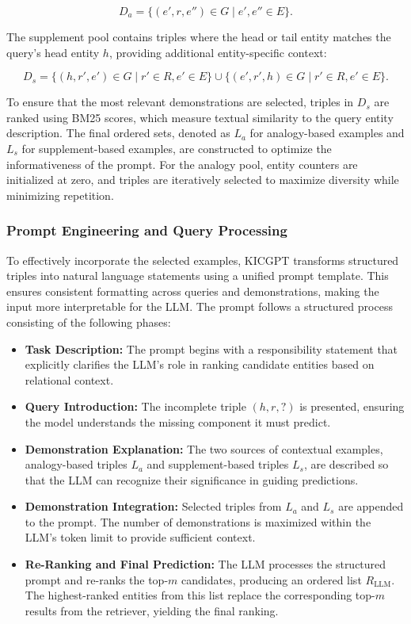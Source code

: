 \documentclass[12pt,a4paper]{article}
\begin{document}
\[
    D_a = \{(e', r, e'') \in G \mid e', e'' \in E\}.
\]

The supplement pool contains triples where the head or tail entity matches the query's head entity \( h \), providing additional entity-specific context:

\[
    D_s = \{(h, r', e') \in G \mid r' \in R, e' \in E\} \cup \{(e', r', h) \in G \mid r' \in R, e' \in E\}.
\]

To ensure that the most relevant demonstrations are selected, triples in \( D_s \) are ranked using BM25 scores, which measure textual similarity to the query entity description.
The final ordered sets, denoted as \( L_a \) for analogy-based examples and \( L_s \) for supplement-based examples, are constructed to optimize the informativeness of the prompt.
For the analogy pool, entity counters are initialized at zero, and triples are iteratively selected to maximize diversity while minimizing repetition.

\subsubsection{Prompt Engineering and Query Processing}

To effectively incorporate the selected examples, KICGPT transforms structured triples into natural language statements using a unified prompt template.
This ensures consistent formatting across queries and demonstrations, making the input more interpretable for the LLM. The prompt follows a structured process consisting of the following phases:

\begin{itemize}
    \item \textbf{Task Description:} The prompt begins with a responsibility statement that explicitly clarifies the LLM’s role in ranking candidate entities based on relational context.
    \item \textbf{Query Introduction:} The incomplete triple \( (h, r, ?) \) is presented, ensuring the model understands the missing component it must predict.
    \item \textbf{Demonstration Explanation:} The two sources of contextual examples, analogy-based triples \( L_a \) and supplement-based triples \( L_s \), are described so that the LLM can recognize their significance in guiding predictions.
    \item \textbf{Demonstration Integration:} Selected triples from \( L_a \) and \( L_s \) are appended to the prompt.
    The number of demonstrations is maximized within the LLM’s token limit to provide sufficient context.
    \item \textbf{Re-Ranking and Final Prediction:} The LLM processes the structured prompt and re-ranks the top-\( m \) candidates, producing an ordered list \( R_{\text{LLM}} \).
    The highest-ranked entities from this list replace the corresponding top-\( m \) results from the retriever, yielding the final ranking.
\end{itemize}
\end{document}
